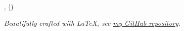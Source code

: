 \documentclass{template/resume}
\begin{document}
\header
  {\myName}
  {\myEmail, \myPhone}
  {\myAddress (\myStatus)}





  





\vspace{30em}
\begin{flushright}
\emph{Beautifully crafted with \LaTeX, see \href{https://github.com/CarlosMecha/Resume}{my GitHub repository}.}
\end{flushright}
\end{document}
